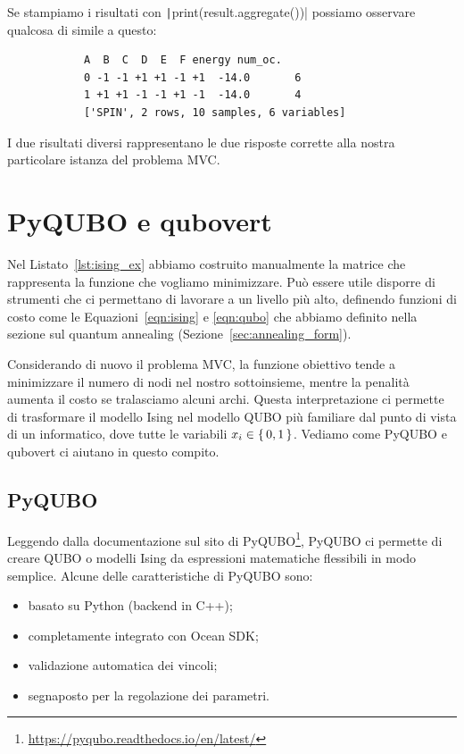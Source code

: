 Se stampiamo i risultati con \texttt|print(result.aggregate())| possiamo osservare qualcosa di simile a questo:
\begin{center}
	\vspace{-.1cm}
	\begin{minipage}{.6\linewidth}
		\begin{verbatim}
			A  B  C  D  E  F energy num_oc.
			0 -1 -1 +1 +1 -1 +1  -14.0       6
			1 +1 +1 -1 -1 +1 -1  -14.0       4
			['SPIN', 2 rows, 10 samples, 6 variables]
		\end{verbatim}
	\end{minipage}
\end{center}
I due risultati diversi rappresentano le due risposte corrette alla nostra particolare istanza del problema MVC.

\section{PyQUBO e qubovert}
Nel Listato~\ref{lst:ising_ex} abbiamo costruito manualmente la matrice che rappresenta la funzione che vogliamo minimizzare. Può essere utile disporre di strumenti che ci permettano di lavorare a un livello più alto, definendo funzioni di costo come le Equazioni~\ref{eqn:ising} e \ref{eqn:qubo} che abbiamo definito nella sezione sul quantum annealing (Sezione~\ref{sec:annealing_form}).

Considerando di nuovo il problema MVC, la funzione obiettivo tende a minimizzare il numero di nodi nel nostro sottoinsieme, mentre la penalità aumenta il costo se tralasciamo alcuni archi. Questa interpretazione ci permette di trasformare il modello Ising nel modello QUBO più familiare \textemdash{}dal punto di vista di un informatico\textemdash{}, dove tutte le variabili $x_i \in \set{0, 1}$. Vediamo come PyQUBO e qubovert ci aiutano in questo compito.

\subsection{PyQUBO}
Leggendo dalla documentazione sul sito di PyQUBO\footnote{\url{https://pyqubo.readthedocs.io/en/latest/}}, PyQUBO ci permette di creare QUBO o modelli Ising da espressioni matematiche flessibili in modo semplice. Alcune delle caratteristiche di PyQUBO sono:
\begin{itemize}
	\item basato su Python (backend in C++);
	\item completamente integrato con Ocean SDK;
	\item validazione automatica dei vincoli;
	\item segnaposto per la regolazione dei parametri.
\end{itemize}

